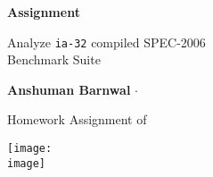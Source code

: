 \begin{titlepage}
    \begin{center}
        \vspace*{3cm}
            
        \Huge
        \textbf{Assignment \hwnumber}
            
        \vspace{3pt}
        
        \huge
        Analyze \texttt{ia-32} compiled SPEC-2006 \\ Benchmark Suite
        
        \vspace{40pt}
            
        \Large
        \textbf{Anshuman Barnwal} $\cdot$ \textbf{\RollNumber}
        
            
        \vfill
        
        Homework Assignment of
            
        \vspace{7pt}
            
        \texttt{[image: \\image]}
        \\
        
        \Large
        
        
        \vspace{7pt}
            
    \end{center}
\end{titlepage}
